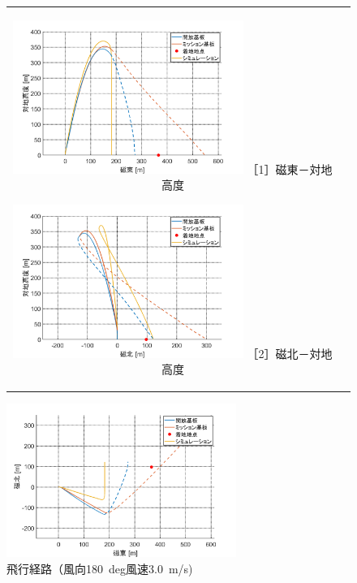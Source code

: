 \documentclass[a4paper,11pt,uplatex]{jsarticle}
\begin{document}
\begin{figure}[H]
	\begin{tabular}{cc}
		\begin{minipage}{.48\textwidth}
			\centering
			\includegraphics[width=75mm]{pic_sim/pos3_eh.png}
			\hspace{16mm} {\small［1］磁東－対地高度}
		\end{minipage}
		\begin{minipage}{.48\textwidth}
			\centering
			\includegraphics[width=75mm]{pic_sim/pos3_nh.png}
			\hspace{16mm} {\small［2］磁北－対地高度}
		\end{minipage}
	\end{tabular}
	\centering
	\begin{minipage}{.48\textwidth}
		\centering
		\includegraphics[width=75mm]{pic_sim/pos3_en.png}
		\hspace{16mm}{\small［3］磁東－磁北}
	\end{minipage}
	\caption{飛行経路（風向\SI{180}{deg}風速\SI{3.0}{m/s})}
	\label{fig:hikoukeirosim}
\end{figure}
\end{document}
